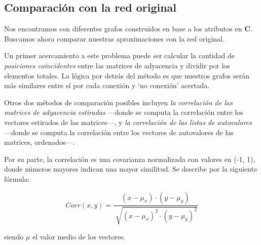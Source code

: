 
\vspace{2em}
\subsection{Comparación con la red original}


Nos encontramos con diferentes grafos construidos en base a los atributos en \textbf{C}. Buscamos ahora comparar nuestras aproximaciones con la red original. 

\vspace{1em}
Un primer acercamiento a este problema puede ser calcular la cantidad de \textit{posiciones coincidentes} entre las matrices de adyacencia y dividir por los elementos totales. La lógica por detrás del método es que nuestros grafos serán más similares entre sí por cada conexión y `no conexión' acertada. %

Otros dos métodos de comparación posibles incluyen \textit{la correlación de las matrices de adyacencia estiradas} ---donde se computa la correlación entre los vectores estirados de las matrices---, y \textit{la correlación de las listas de autovalores} ---donde se computa la correlación entre los vectores de autovalores de las matrices, ordenados---. 

Por su parte, la correlación es una covarianza normalizada con valores en (-1, 1), donde números mayores indican una mayor similitud. Se describe por la siguiente fórmula:

\vspace{1em}
\begin{equation}
    Corr(x, y) = \frac{(x - \mu_{x}) \cdot (y - \mu_{y})}{\sqrt[]{(x - \mu_{x})^{2} \cdot (y - \mu_{y})^{2}}}
\end{equation}

\vspace{1em}
\noindent siendo $\mu$ el valor medio de los vectores.

